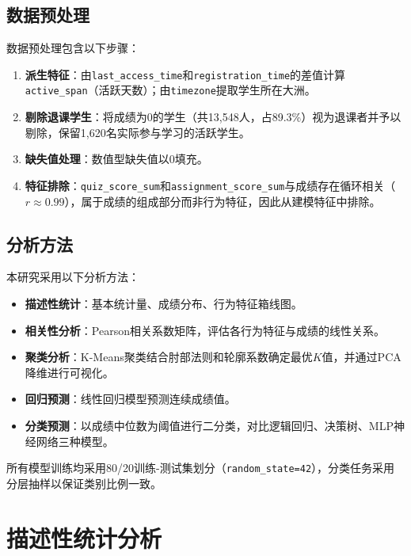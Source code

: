 \documentclass[UTF8, 12pt, a4paper]{ctexart}
\begin{document}
\subsection{数据预处理}

数据预处理包含以下步骤：
\begin{enumerate}
    \item \textbf{派生特征}：由\texttt{last\_access\_time}和\texttt{registration\_time}的差值计算\texttt{active\_span}（活跃天数）；由\texttt{timezone}提取学生所在大洲。
    \item \textbf{剔除退课学生}：将成绩为0的学生（共13,548人，占89.3\%）视为退课者并予以剔除，保留1,620名实际参与学习的活跃学生。
    \item \textbf{缺失值处理}：数值型缺失值以0填充。
    \item \textbf{特征排除}：\texttt{quiz\_score\_sum}和\texttt{assignment\_score\_sum}与成绩存在循环相关（$r \approx 0.99$），属于成绩的组成部分而非行为特征，因此从建模特征中排除。
\end{enumerate}

\subsection{分析方法}

本研究采用以下分析方法：
\begin{itemize}
    \item \textbf{描述性统计}：基本统计量、成绩分布、行为特征箱线图。
    \item \textbf{相关性分析}：Pearson相关系数矩阵，评估各行为特征与成绩的线性关系。
    \item \textbf{聚类分析}：K-Means聚类结合肘部法则和轮廓系数确定最优$K$值，并通过PCA降维进行可视化。
    \item \textbf{回归预测}：线性回归模型预测连续成绩值。
    \item \textbf{分类预测}：以成绩中位数为阈值进行二分类，对比逻辑回归、决策树、MLP神经网络三种模型。
\end{itemize}

所有模型训练均采用80/20训练-测试集划分（\texttt{random\_state=42}），分类任务采用分层抽样以保证类别比例一致。

\section{描述性统计分析}
\end{document}
